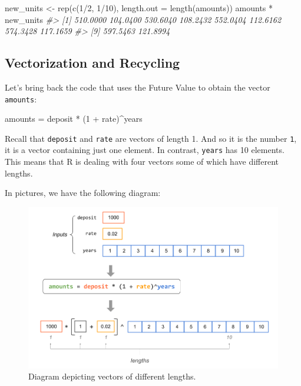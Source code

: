 \documentclass[
]{book}
\newenvironment{Shaded}{\begin{snugshade}}{\end{snugshade}}
\newcommand{\AttributeTok}[1]{\textcolor[rgb]{0.77,0.63,0.00}{#1}}
\newcommand{\CommentTok}[1]{\textcolor[rgb]{0.56,0.35,0.01}{\textit{#1}}}
\newcommand{\DecValTok}[1]{\textcolor[rgb]{0.00,0.00,0.81}{#1}}
\newcommand{\FunctionTok}[1]{\textcolor[rgb]{0.00,0.00,0.00}{#1}}
\newcommand{\NormalTok}[1]{#1}
\newcommand{\OtherTok}[1]{\textcolor[rgb]{0.56,0.35,0.01}{#1}}
\newcommand{\SpecialCharTok}[1]{\textcolor[rgb]{0.00,0.00,0.00}{#1}}
\begin{document}
\begin{Shaded}
\begin{Highlighting}[]
\NormalTok{new\_units }\OtherTok{\textless{}{-}} \FunctionTok{rep}\NormalTok{(}\FunctionTok{c}\NormalTok{(}\DecValTok{1}\SpecialCharTok{/}\DecValTok{2}\NormalTok{, }\DecValTok{1}\SpecialCharTok{/}\DecValTok{10}\NormalTok{), }\AttributeTok{length.out =} \FunctionTok{length}\NormalTok{(amounts))}
\NormalTok{amounts }\SpecialCharTok{*}\NormalTok{ new\_units}
\CommentTok{\#\textgreater{}  [1] 510.0000 104.0400 530.6040 108.2432 552.0404 112.6162 574.3428 117.1659}
\CommentTok{\#\textgreater{}  [9] 597.5463 121.8994}
\end{Highlighting}
\end{Shaded}

\hypertarget{vectorization-and-recycling}{%
\subsection{Vectorization and Recycling}\label{vectorization-and-recycling}}

Let's bring back the code that uses the Future Value to obtain the vector
\texttt{amounts}:

\begin{Shaded}
\begin{Highlighting}[]
\NormalTok{amounts }\OtherTok{=}\NormalTok{ deposit }\SpecialCharTok{*}\NormalTok{ (}\DecValTok{1} \SpecialCharTok{+}\NormalTok{ rate)}\SpecialCharTok{\^{}}\NormalTok{years}
\end{Highlighting}
\end{Shaded}

Recall that \texttt{deposit} and \texttt{rate} are vectors of length 1. And so it is the
number \texttt{1}, it is a vector containing just one element. In contrast, \texttt{years}
has 10 elements. This means that R is dealing with four vectors some of which
have different lengths.

In pictures, we have the following diagram:

\begin{figure}

{\centering \includegraphics[width=0.9\linewidth]{images/vectors/vectorized1} 

}

\caption{Diagram depicting vectors of different lengths.}\label{fig:unnamed-chunk-77}
\end{figure}
\end{document}
